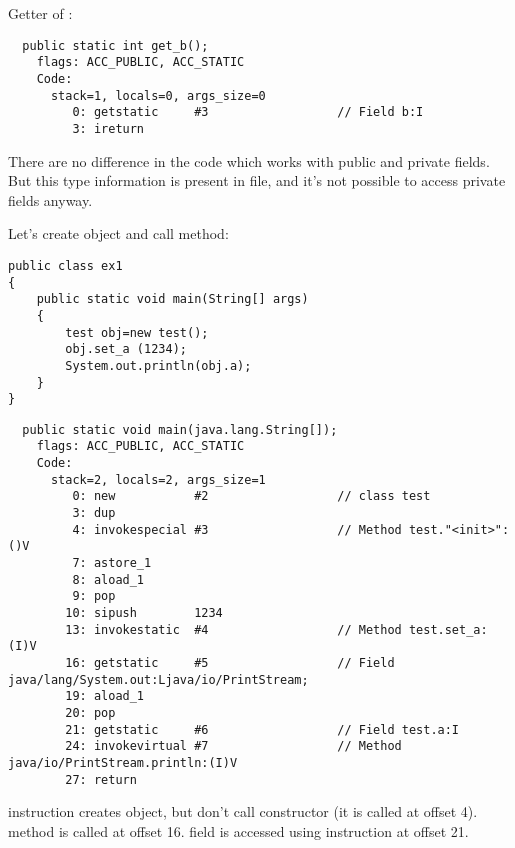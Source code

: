 Getter of :

\begin{lstlisting}
  public static int get_b();
    flags: ACC_PUBLIC, ACC_STATIC
    Code:
      stack=1, locals=0, args_size=0
         0: getstatic     #3                  // Field b:I
         3: ireturn       
\end{lstlisting}

There are no difference in the code which works with public and private fields.
But this type information is present in  file, 
and it's not possible to access private fields anyway.

Let's create object and call method:

\begin{lstlisting}[caption=ex1.java]
public class ex1
{
	public static void main(String[] args)
	{
		test obj=new test();
		obj.set_a (1234);
		System.out.println(obj.a);
	}
}
\end{lstlisting}

\begin{lstlisting}
  public static void main(java.lang.String[]);
    flags: ACC_PUBLIC, ACC_STATIC
    Code:
      stack=2, locals=2, args_size=1
         0: new           #2                  // class test
         3: dup           
         4: invokespecial #3                  // Method test."<init>":()V
         7: astore_1      
         8: aload_1       
         9: pop           
        10: sipush        1234
        13: invokestatic  #4                  // Method test.set_a:(I)V
        16: getstatic     #5                  // Field java/lang/System.out:Ljava/io/PrintStream;
        19: aload_1       
        20: pop           
        21: getstatic     #6                  // Field test.a:I
        24: invokevirtual #7                  // Method java/io/PrintStream.println:(I)V
        27: return        
\end{lstlisting}

 instruction creates object, but don't call constructor (it is called at offset 4).
 method is called at offset 16.
 field is accessed using  instruction at offset 21.
